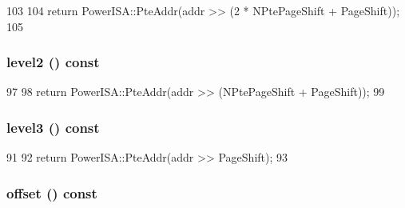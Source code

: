 \begin{DoxyCode}
103     {
104         return PowerISA::PteAddr(addr >> (2 * NPtePageShift + PageShift));
105     }
\end{DoxyCode}
\hypertarget{structPowerISA_1_1VAddr_a5fb0a2faeaa59b4d186256f71f494020}{
\subsubsection[{level2}]{ level2 () const}}
\label{structPowerISA_1_1VAddr_a5fb0a2faeaa59b4d186256f71f494020}



\begin{DoxyCode}
97     {
98         return PowerISA::PteAddr(addr >> (NPtePageShift + PageShift));
99     }
\end{DoxyCode}
\hypertarget{structPowerISA_1_1VAddr_a4ea534e4bdbdfebe2d82eddb86284b5d}{
\subsubsection[{level3}]{ level3 () const}}
\label{structPowerISA_1_1VAddr_a4ea534e4bdbdfebe2d82eddb86284b5d}



\begin{DoxyCode}
91     {
92         return PowerISA::PteAddr(addr >> PageShift);
93     }
\end{DoxyCode}
\hypertarget{structPowerISA_1_1VAddr_ad7614ecd306d0a915379cd6fae8b02de}{
\subsubsection[{offset}]{ offset () const}}
\label{structPowerISA_1_1VAddr_ad7614ecd306d0a915379cd6fae8b02de}



